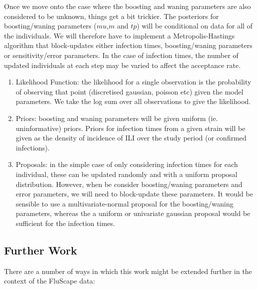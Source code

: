 \documentclass[a4paper,11pt,twoside]{article}
\begin{document}
Once we move onto the case where the boosting and waning parameters are also considered to be unknown, things get a bit trickier. The posteriors for boosting/waning parameters ($mu$,$m$ and $tp$) will be conditional on data for all of the individuals. We will therefore have to implement a Metropolis-Hastings algorithm that block-updates either infection times, boosting/waning parameters or sensitivity/error parameters. In the case of infection times, the number of updated individuals at each step may be varied to affect the acceptance rate.

\begin{enumerate}
\item Likelihood Function: the likelihood for a single observation is the probability of observing that point (discretised gaussian, poisson etc) given the model parameters. We take the log sum over all observations to give the likelihood.
\item Priors: boosting and waning parameters will be given uniform (ie. uninformative) priors. Priors for infection times from a given strain will be given as the density of incidence of ILI over the study period (or confirmed infections).
\item Proposals: in the simple case of only considering infection times for each individual, these can be updated randomly and with a uniform proposal distribution. However, when be consider boosting/waning parameters and error parameters, we will need to block-update these parameters. It would be sensible to use a multivariate-normal proposal for the boosting/waning parameters, whereas the a uniform or univariate gaussian proposal would be sufficient for the infection times.
\end{enumerate}

\subsection{Further Work}
There are a number of ways in which this work might be extended further in the context of the FluScape data:
\end{document}

